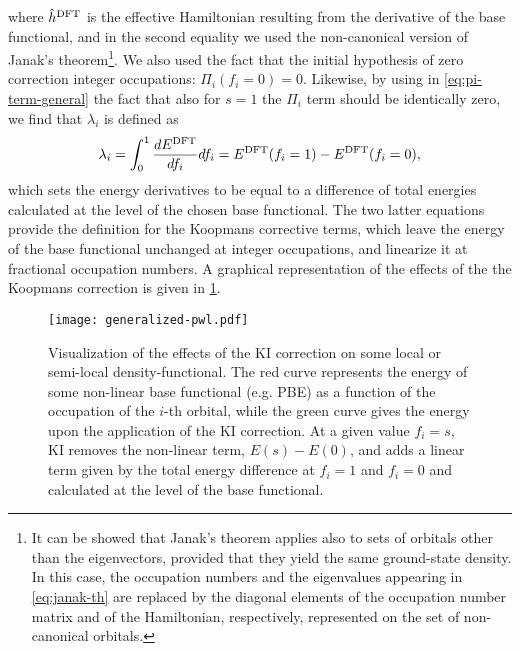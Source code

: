 %
where $\hat{h}^{\rm DFT}$ is the effective Hamiltonian resulting from the derivative of the base functional, and in the second equality we used the non-canonical version of Janak's theorem\footnote{It can be showed that Janak's theorem applies also to sets of orbitals other than the eigenvectors, provided that they yield the same ground-state density. In this case, the occupation numbers and the eigenvalues appearing in \cref{eq:janak-th} are replaced by the diagonal elements of the occupation number matrix and of the Hamiltonian, respectively, represented on the set of non-canonical orbitals.}. We also used the fact that the initial hypothesis of zero correction integer occupations: $\Pi_i(f_i=0) = 0$. Likewise, by using in \cref{eq:pi-term-general} the fact that also for $s=1$ the $\Pi_i$ term should be identically zero, we find that $\lambda_i$ is defined as
%
\begin{equation}
    \lambda_i = \int_0^{1} \frac{dE^{\rm DFT}}{df_i} df_i = E^{\rm DFT}(f_i=1) - E^{\rm DFT}(f_i=0) ,
    \label{eq:lambda-definition}
\end{equation}
%
which sets the energy derivatives to be equal to a difference of total energies calculated at the level of the chosen base functional. The two latter equations provide the definition for the Koopmans corrective terms, which leave the energy of the base functional unchanged at integer occupations, and linearize it at fractional occupation numbers. A graphical representation of the effects of the the Koopmans correction is given in \cref{fig:kc-correction-visual}.

\begin{figure}
    \centering
    \texttt{[image: generalized-pwl.pdf]}
    \caption[Graphical representation of the KI correction.]{Visualization of the effects of the KI correction on some local or semi-local density-functional. The red curve represents the energy of some non-linear base functional (e.g. PBE) as a function of the occupation of the $i$-th orbital, while the green curve gives the energy upon the application of the KI correction. At a given value $f_i=s$, KI removes the non-linear term, $E(s)-E(0)$, and adds a linear term given by the total energy difference at $f_i=1$ and $f_i=0$ and calculated at the level of the base functional.}
    \label{fig:kc-correction-visual}
\end{figure}

